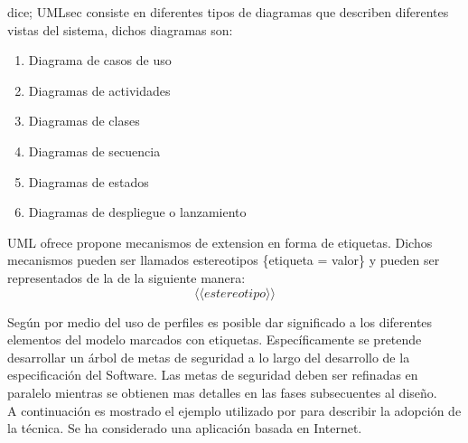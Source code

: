 \documentclass[runningheads,a4paper]{llncs}
\begin{document}
\cite{UsingUMLsec} dice; \gls{UMLsec} consiste en diferentes tipos de diagramas que describen diferentes vistas del sistema, dichos diagramas son:

\begin{enumerate}
	\item Diagrama de casos de uso
	\item Diagramas de actividades
	\item Diagramas de clases
	\item Diagramas de secuencia
	\item Diagramas de estados
	\item Diagramas de despliegue o lanzamiento\\
\end{enumerate}

\gls{UML} ofrece propone mecanismos de extension en forma de etiquetas. Dichos mecanismos pueden ser llamados estereotipos \{etiqueta = valor\} y pueden ser representados de la de la siguiente manera: \[ \langle \langle estereotipo \rangle \rangle\]

Según \cite{UsingUMLsec} por medio del uso de perfiles es posible dar significado a los diferentes elementos del modelo marcados con etiquetas. Específicamente se pretende desarrollar un árbol de metas de seguridad a lo largo del desarrollo de la especificación del \gls{Software}. Las metas de seguridad deben ser refinadas en paralelo mientras se obtienen mas detalles en las fases subsecuentes al diseño.\\

A continuación es mostrado el ejemplo utilizado por \cite{UsingUMLsec} para describir la adopción de la técnica. Se ha considerado una aplicación basada en Internet.\\
\end{document}

